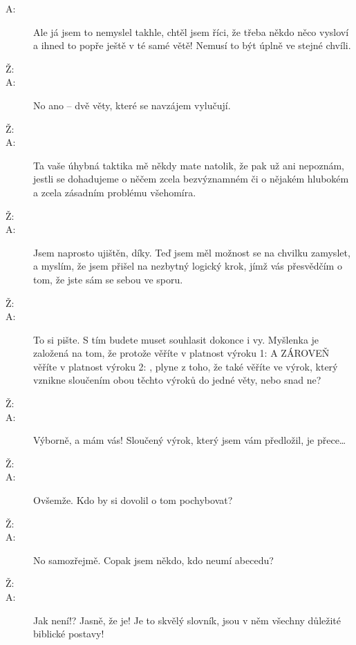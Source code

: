 \documentclass[12pt]{article}
\begin{document}
\begin{description}
\item[A:] Ale já jsem to nemyslel takhle, chtěl jsem říci, že třeba někdo
    něco vysloví a ihned to popře ještě v té samé větě! Nemusí to být úplně ve stejné
    chvíli.

\item[Ž:]

\item[A:] No ano -- dvě věty, které se navzájem vylučují.

\item[Ž:]

\item[A:] Ta vaše úhybná taktika mě někdy mate natolik, že pak už ani nepoznám,
    jestli se dohadujeme o něčem zcela bezvýznamném či o nějakém hlubokém a zcela
    zásadním problému všehomíra.

\item[Ž:]

\item[A:] Jsem naprosto ujištěn, díky. Teď jsem měl možnost se na chvilku
    zamyslet, a myslím, že jsem přišel na nezbytný logický krok, jímž
    vás přesvědčím o tom, že jste sám se sebou ve sporu.

\item[Ž:]

\item[A:] To si pište. S tím budete muset souhlasit dokonce i vy. Myšlenka
    je založená na tom, že protože věříte v platnost výroku 1:  A ZÁROVEŇ věříte v platnost výroku 2: ,
    plyne z toho, že také věříte ve výrok, který vznikne sloučením obou těchto
    výroků do jedné věty, nebo snad ne?

\item[Ž:]

\item[A:] Výborně, a mám vás! Sloučený výrok, který jsem vám předložil,
    je přece…

\item[Ž:]

\item[A:] Ovšemže. Kdo by si dovolil o tom pochybovat?

\item[Ž:]

\item[A:] No samozřejmě. Copak jsem někdo, kdo neumí abecedu?

\item[Ž:]

\item[A:] Jak není!? Jasně, že je! Je to skvělý slovník, jsou v něm všechny
    důležité biblické postavy!


\end{description}
\end{document}
